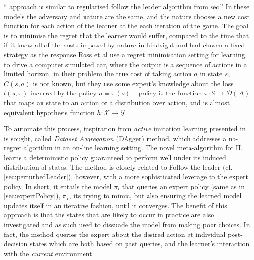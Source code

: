 
``\cite{RossGB11} approach is similar to regularised follow the leader 
algorithm from sec.'' 
In these models the adversary and nature are the same, and the nature chooses a 
new cost function for each action of the learner at the each iteration of the 
game. The goal is to minimise the regret that the learner would suffer, 
compared to the time that if it knew all of the costs imposed by nature in 
hindsight and had chosen a fixed strategy as the response
Ross et  al use a regret minimisation setting for learning to drive a computer 
simulated car, where the output is a sequence of actions in a limited horizon. 
in their problem the true cost of taking action $a$ in state $s$, $C(s,a)$ is 
not 
known, but they use some expert's knowledge about the loss $l(s,\pi)$ incurred 
by the policy $a=\pi(s)$ -- policy is the function $\pi:\mathcal{S}\to 
\mathcal{D}(\mathcal{A})$ that maps an state to an action or a distribution 
over action, and is almost equivalent hypothesis function $h:\mathcal{X}\to 
\mathcal{Y}$



To automate this process, inspiration from \emph{active} imitation learning 
presented in \cite{RossGB11} is sought, called \emph{Dataset Aggregation} 
(DAgger) method, which addresses a no-regret algorithm in an on-line learning 
setting. 
The novel meta-algorithm for IL learns a deterministic policy guaranteed to 
perform well under its induced distribution of states. 
The method is closely related to Follow-the-leader (cf. 
\cref{sec:perturbedLeader}), however, with a more sophisticated leverage to the 
expert policy. 
In short, it entails the model $\pi_i$ that queries an expert policy (same as 
in \cref{sec:expertPolicy}), $\pi_\star$, its trying to mimic, 
but also ensuring the learned model updates itself in an iterative fashion, 
until it converges. 
The benefit of this approach is that the states that are likely to occur in 
practice are also investigated and as such used to dissuade the model from 
making poor choices. In fact, the method queries the expert about the desired 
action at individual post-decision states which are both based on past queries, 
and the learner's interaction with the \emph{current} environment.

